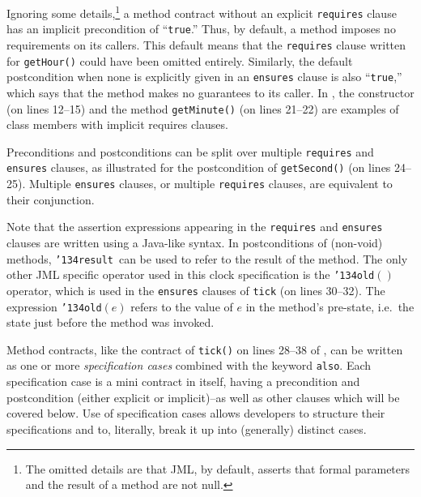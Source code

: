 \documentclass{llncs}
\def\old{\texttt{\char'134old}}
\def\result{\texttt{\char'134result}}
\begin{document}
Ignoring some details,\footnote{
The omitted details are that JML, by default, asserts that formal
parameters and the result of a method are not null.
}
% 
%
a method contract without an explicit \texttt{requires} clause has
an implicit precondition of ``\texttt{true}.''  Thus, by default, a
method imposes no requirements on its callers.  This default means
that the \texttt{requires} clause written for \texttt{getHour()} could
have been omitted entirely.
Similarly, the default postcondition 
when none is explicitly given in an \texttt{ensures} clause is also
``\texttt{true},'' which says that the method makes no guarantees to
its caller.
In , the constructor (on lines 12--15)
and the method \texttt{getMinute()} (on lines 21--22) are
examples of class members with implicit requires clauses.

Preconditions and postconditions can be split over multiple \texttt{requires}
and \texttt{ensures} clauses, as illustrated for the postcondition of 
\texttt{getSecond()} (on lines 24--25).  Multiple \texttt{ensures}
clauses, or multiple \texttt{requires} clauses, are equivalent to
their conjunction. 

Note that the assertion expressions appearing in the \texttt{requires} and
\texttt{ensures} clauses are written using a Java-like syntax.
%
\GMARGIN{\old}
\MARGIN{\result}
%
In postconditions of (non-void) methods, \result\ can be used to refer to the 
result of the method.
The only other JML specific operator used in this clock specification is the
\old$()$ operator, which is used in the \texttt{ensures} clauses of
\texttt{tick} (on lines 30--32).  The 
expression \old$(e)$ refers to the value of $e$ in the method's pre-state,
i.e.\ the state just before the method was invoked.

Method contracts, like the contract of \texttt{tick()} on lines 28--38
of , can be written as one or
more \emph{specification cases} combined with the keyword \texttt{also}.
Each specification case is a mini contract in itself, having a precondition
and postcondition (either explicit or implicit)--as well as other clauses
which will be covered below.
Use of specification cases allows developers to structure their
specifications and to, literally, break it up into (generally) distinct cases.
\end{document}
